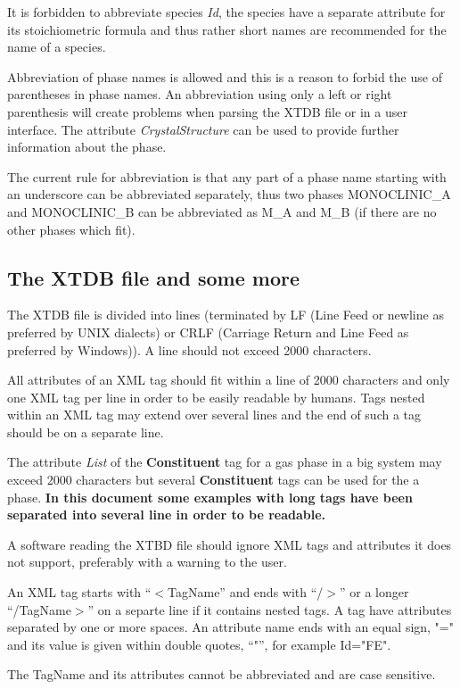 \documentclass{article}
\begin{document}
It is forbidden to abbreviate species {\em Id}, the species have a
separate attribute for its stoichiometric formula and thus rather
short names are recommended for the name of a species.

Abbreviation of phase names is allowed and this is a reason to forbid
the use of parentheses in phase names.  An abbreviation using only a
left or right parenthesis will create problems when parsing the XTDB
file or in a user interface.  The attribute {\em CrystalStructure}
can be used to provide further information about the phase.

The current rule for abbreviation is that any part of a phase name
starting with an underscore can be abbreviated separately, thus two
phases MONOCLINIC\_A and MONOCLINIC\_B can be abbreviated as M\_A and
M\_B (if there are no other phases which fit).


\subsection{The XTDB file and some more}

The XTDB file is divided into lines (terminated by LF (Line Feed or
newline as preferred by UNIX dialects) or CRLF (Carriage Return and
Line Feed as preferred by Windows)).  A line should not exceed 2000
characters.

All attributes of an XML tag should fit within a line of 2000
characters and only one XML tag per line in order to be easily
readable by humans.  Tags nested within an XML tag may extend over
several lines and the end of such a tag should be on a separate line.

The attribute {\em List} of the {\bf Constituent} tag for a gas phase
in a big system may exceed 2000 characters but several {\bf
  Constituent} tags can be used for the a phase.  {\bf In this
  document some examples with long tags have been separated into several
  line in order to be readable.}

A software reading the XTBD file should ignore XML tags and attributes
it does not support, preferably with a warning to the user.

An XML tag starts with ``$<$TagName'' and ends with ``/$>$'' or a
longer ``/TagName$>$'' on a separte line if it contains nested tags.
A tag have attributes separated by one or more spaces.  An attribute
name ends with an equal sign, "=" and its value is given within double
quotes, ``"'', for example Id="FE".

The TagName and its attributes cannot be abbreviated and are case
sensitive.
\end{document}
